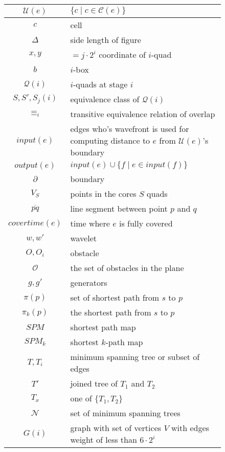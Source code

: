 \begin{figure}
\begin{center}
\begin{tabular}{| c | l |}
	\hline
	$\mathcal{U}(e)$ & $\{c \mid c \in \mathcal{C}(e)\}$ \\
	\hline
	$c$ & cell \\
	\hline
	$\Delta$ & side length of figure \\
	\hline
	$x,y$ & $= j \cdot 2^i$ coordinate of $i$-quad \\
	\hline
	$b$ & $i$-box \\
	\hline
	$\mathcal{Q}(i)$ & $i$-quads at stage $i$ \\
	\hline
	$S, S', S_j(i)$ & equivalence class of $\mathcal{Q}(i)$ \\
	\hline
	$\equiv_i$ & transitive equivalence relation of overlap \\
	\hline
	$input(e)$ & edges who's wavefront is used for computing distance to $e$ from $\mathcal{U}(e)$'s boundary \\
	\hline
	$output(e)$ & $input(e) \cup \{f \mid e \in input(f)\}$ \\
	\hline
	$\partial$ & boundary \\
	\hline
	$V_S$ & points in the cores $S$ quads \\
	\hline
	$\overline{pq}$ & line segment between point $p$ and $q$ \\
	\hline
	$covertime(e)$ & time where $e$ is fully covered \\
	\hline
	$w,w'$ & wavelet \\
	\hline
	$O, O_i$ & obstacle \\
	\hline
	$\mathcal{O}$ & the set of obstacles in the plane \\
	\hline
	$g,g'$ & generators \\
	\hline
	$\pi(p)$ & set of shortest path from $s$ to $p$ \\
	\hline
	$\pi_k(p)$ & the shortest path from $s$ to $p$ \\
	\hline
	$SPM$ & shortest path map \\
	\hline
	$SPM_k$ & shortest $k$-path map\\
	\hline
	$T, T_i$ & minimum spanning tree or subset of edges \\
	\hline
	$T'$ & joined tree of $T_1$ and $T_2$ \\
	\hline
	$T_x$ & one of $\{T_1, T_2\}$ \\
	\hline
	$\mathcal{N}$ & set of minimum spanning trees \\
	\hline
	$G(i)$ & graph with set of vertices $V$ with edges weight of less than $6 \cdot 2^i$ \\
	\hline
\end{tabular}
\end{center}
\end{figure}


